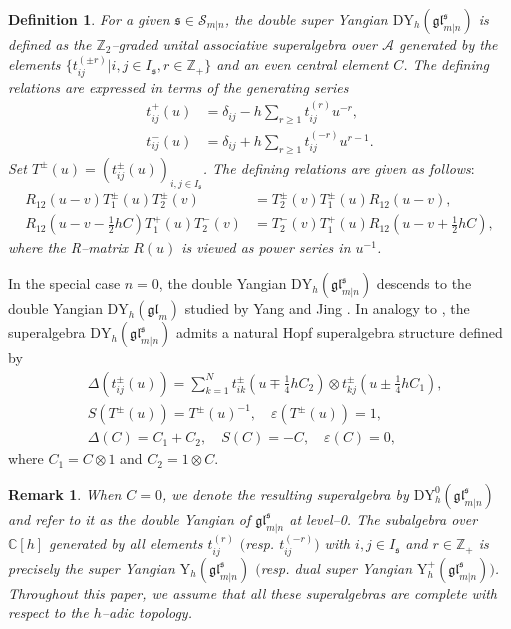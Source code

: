\documentclass[a4paper,12pt]{article}
\newtheorem{rema}[theo]{Remark}
\newtheorem{defi}[theo]{Definition}
\numberwithin{equation}{section}
\begin{document}
\begin{defi}\label{DY}
For a given $\mathfrak{s}\in\mathcal{S}_{m|n}$, the double super Yangian $\mathrm{DY}_{h}(\mathfrak{gl}_{m|n}^{\mathfrak{s}})$ is defined as the $\mathbb{Z}_{2}$--graded unital associative superalgebra over $\mathcal{A}$ generated by the elements $\{t_{ij}^{(\pm r)}|i,j\in I_{\mathfrak{s}}, r\in \mathbb{Z}_{+}\}$ and an even central element $C$. The defining relations are expressed in terms of the generating series 
\begin{align*}
t_{ij}^{+}(u)&=\delta_{ij}-h\sum_{r\geqslant 1}t_{ij}^{(r)}u^{-r}, \\
t_{ij}^{-}(u)&=\delta_{ij}+h\sum_{r\geqslant 1}t_{ij}^{(-r)}u^{r-1}.
\end{align*}
Set $T^{\pm}(u)=\left(t_{ij}^{\pm}(u)\right)_{i,j\in I_{\mathfrak{s}}}$. The defining relations are given as follows$\mathrm{:}$
\begin{align}\label{RTT1}
R_{12}(u-v)T_{1}^{\pm}(u)T_{2}^{\pm}(v)&=T_{2}^{\pm}(v)T_{1}^{\pm}(u)R_{12}(u-v),\\ \label{RTT2}
R_{12}(u-v-\frac{1}{2}hC)T_{1}^{+}(u)T_{2}^{-}(v)&=T_{2}^{-}(v)T_{1}^{+}(u)R_{12}(u-v+\frac{1}{2}hC),
\end{align}
where the R--matrix $R(u)$ is viewed as power series in $u^{-1}$.
\end{defi}

In the special case $n=0$, the double Yangian $\mathrm{DY}_{h}(\mathfrak{gl}_{m|n}^{\mathfrak{s}})$ descends to the double Yangian $\mathrm{DY}_{h}(\mathfrak{gl}_{m})$ studied by Yang and Jing \cite{YJ24}.
In analogy to \cite{BK25-2}, the superalgebra $\mathrm{DY}_{h}(\mathfrak{gl}_{m|n}^{\mathfrak{s}})$ admits a natural Hopf superalgebra structure defined by 
\begin{align*}
&\Delta(t_{ij}^{\pm}(u))=\sum_{k=1}^{N}t_{ik}^{\pm}(u\mp\frac{1}{4}hC_2)\otimes t_{kj}^{\pm}(u\pm\frac{1}{4}hC_1),\\
&S(T^{\pm}(u))=T^{\pm}(u)^{-1},\quad \varepsilon(T^{\pm}(u))=1,\\
&\Delta(C)=C_1+C_2,\quad S(C)=-C,\quad \varepsilon(C)=0,
\end{align*}
where $C_{1}=C\otimes 1$ and $C_{2}=1\otimes C$.

\begin{rema}
 When $C=0$, we denote the resulting superalgebra by $\mathrm{DY}_{h}^{0}(\mathfrak{gl}_{m|n}^{\mathfrak{s}})$ and refer to it as the double Yangian of $\mathfrak{gl}_{m|n}^{\mathfrak{s}}$ at level--0. The subalgebra over $\mathbb{C}[h]$ generated by all elements $t_{ij}^{(r)}$ $($resp. $t_{ij}^{(-r)})$ with $i,j\in I_{\mathfrak{s}}$ and $r\in\mathbb{Z}_{+}$ is precisely the super Yangian $\mathrm{Y}_{h}(\mathfrak{gl}_{m|n}^{\mathfrak{s}})$ $($resp. dual super Yangian $\mathrm{Y}_{h}^{+}(\mathfrak{gl}_{m|n}^{\mathfrak{s}}))$. Throughout this paper, we assume that all these superalgebras are complete with respect to the $h$--adic topology.
\end{rema}
\end{document}
